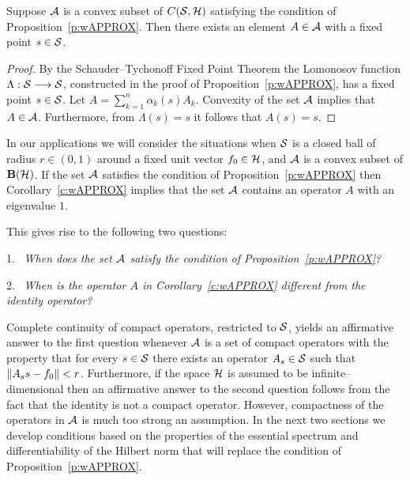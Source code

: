 \medskip

\goodbreak

\begin{cor} \label{c:wAPPROX}
Suppose ${\cal A}$ is a convex subset of $C({\cal S},{\cal H})$ satisfying the condition of
Proposition~\ref{p:wAPPROX}. Then there exists an element $A\in{\cal A}$ with a
fixed point $s\in{\cal S}$.
\end{cor}

\begin{proof}
By the Schauder--Tychonoff Fixed Point Theorem the Lomonosov function
$\Lambda:{\cal S}\longrightarrow{\cal S}$, constructed in the proof of Proposition~\ref{p:wAPPROX},
has a fixed point $s\in{\cal S}$. Let $A=\sum_{k=1}^n\alpha_k(s)A_k$. Convexity of
the set ${\cal A}$ implies that $A\in{\cal A}$. Furthermore, from $\Lambda(s)=s$ it
follows that $A(s)=s$.
\end{proof}

\begin{rem}
In our applications we will consider the situations when ${\cal S}$ is a closed
ball of radius $r\in(0,1)$ around a fixed unit vector $f_0\in{\cal H}$, and ${\cal A}$ is
a convex subset of $\mathbf B(\cal H)$. If the set ${\cal A}$ satisfies the condition of
Proposition~\ref{p:wAPPROX} then Corollary~\ref{c:wAPPROX} implies that the
set ${\cal A}$ contains an operator $A$ with an eigenvalue $1$.

\medskip

This gives rise to the following two questions:

\smallskip

1.~ {\em When does the set ${\cal A}$ satisfy the condition of
Proposition~\ref{p:wAPPROX}?}

2.~ {\em When is the operator $A$ in Corollary~\ref{c:wAPPROX} different from
the identity operator? }

\smallskip

Complete continuity of compact operators, restricted to ${\cal S}$, yields an
affirmative answer to the first question whenever ${\cal A}$ is a set of compact
operators with the property that for every $s\in{\cal S}$ there exists an operator
$A_s\in{\cal S}$ such that $\left\Vert A_s s - f_0\right\Vert<r$. Furthermore, if the space ${\cal H}$
is assumed to be infinite--dimensional then an affirmative answer to the
second question follows from the fact that the identity is not a compact
operator. However, compactness of the operators in ${\cal A}$ is much too strong an
assumption. In the next two sections we develop conditions based on the
properties of the essential spectrum and differentiability of the Hilbert
norm that will replace the condition of Proposition~\ref{p:wAPPROX}.
\end{rem}

